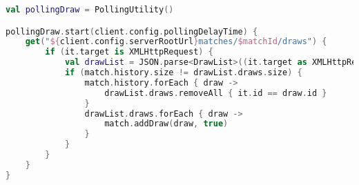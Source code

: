 \begin{lstlisting}[style=lstStyleFramed, language=Kotlin, caption={Einbindung bzw. Nutzung der \code{PollingUtility} Klasse}, label=lst:pollingUsage, float]
val pollingDraw = PollingUtility()

pollingDraw.start(client.config.pollingDelayTime) {
	get("${client.config.serverRootUrl}matches/$matchId/draws") {
		if (it.target is XMLHttpRequest) {
			val drawList = JSON.parse<DrawList>((it.target as XMLHttpRequest).responseText)
			if (match.history.size != drawList.draws.size) {
				match.history.forEach { draw ->
					drawList.draws.removeAll { it.id == draw.id }
				}
				drawList.draws.forEach { draw ->
					match.addDraw(draw, true)
				}
			}
		}
	}
}
\end{lstlisting}